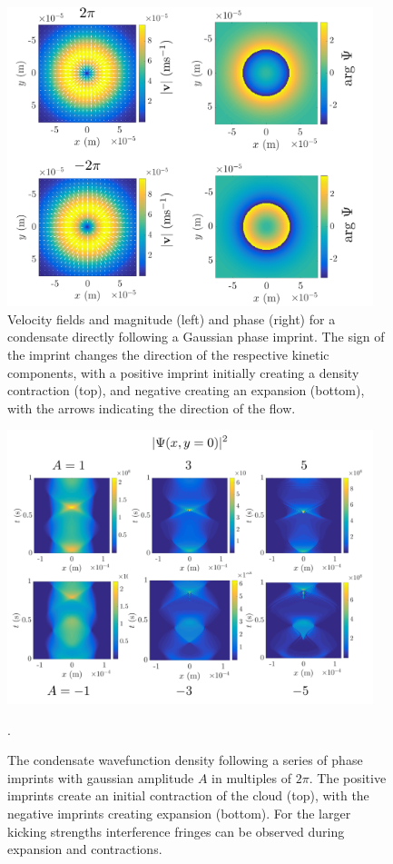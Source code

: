 {\begin{figure}\centering
    \includegraphics[width=0.95\textwidth]{Images/ch4_vtx/velocity/gaussian_imprint}
    \caption{Velocity fields and magnitude (left) and phase (right) for a condensate directly following a Gaussian phase imprint. The sign of the imprint changes the direction of the respective kinetic components, with a positive imprint initially creating a density contraction (top), and negative creating an expansion (bottom), with the arrows indicating the direction of the flow.}\label{fig:gaussian}
\end{figure}


\begin{figure}\centering
    \includegraphics[width=0.95\textwidth]{Images/ch4_vtx/gaussian_imprint_A}
    \caption{The condensate wavefunction density following a series of phase imprints with gaussian amplitude $A$ in multiples of $2\pi$. The positive imprints create an initial contraction of the cloud (top), with the negative imprints creating expansion (bottom). For the larger kicking strengths interference fringes can be observed during expansion and contractions.}.\label{fig:gaussian_wfc}
\end{figure}

}
